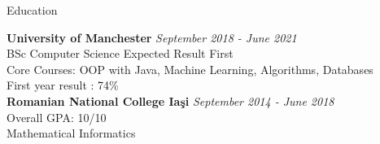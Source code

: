 \documentclass{resume} %
\begin{document}

\begin{rSection}{Education}

{\bf University of Manchester} \hfill {\em September 2018 - June 2021} 
\\ BSc Computer Science Expected Result First
\\ Core Courses: OOP with Java, Machine Learning, Algorithms, Databases
\\ First year result : 74\% \\
{\bf Romanian National College Ia\c{s}i} \hfill {\em September 2014 - June 2018} 
\\ { Overall GPA: 10/10}
\\ Mathematical Informatics

 

\end{rSection}

\end{document}
